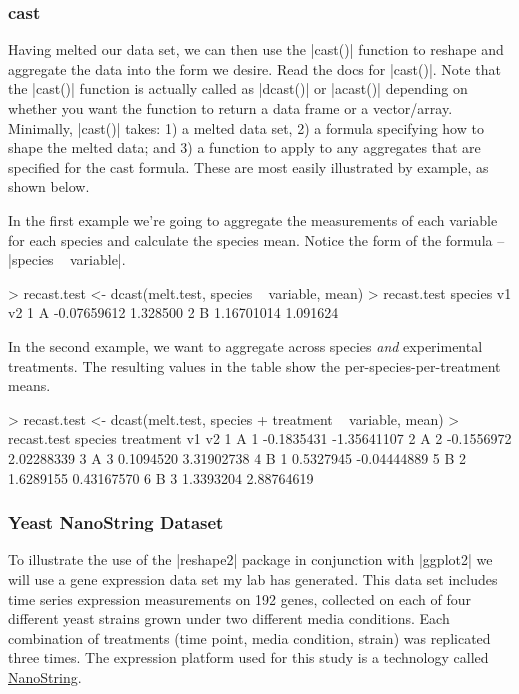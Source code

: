 \subsubsection{cast}

Having melted our data set, we can then use the |cast()| function to reshape and aggregate the data into the form we desire.  Read the docs for |cast()|.  Note that the |cast()| function is actually called as |dcast()| or |acast()| depending on whether you want the function to return a data frame or a vector/array. Minimally, |cast()| takes: 1) a melted data set,  2) a formula specifying how to shape the melted data; and 3) a function to apply to any aggregates that are specified for the cast formula. These are most easily illustrated by example, as shown below.

In the first example we're going to aggregate the measurements of each variable for each species and calculate the species mean.  Notice the form of the formula -- |species ~ variable|.
%
\begin{R}
> recast.test <- dcast(melt.test, species ~ variable, mean)
> recast.test
  species          v1       v2
1       A -0.07659612 1.328500
2       B  1.16701014 1.091624
\end{R}

In the second example, we want to aggregate across species \emph{and} experimental treatments.  The resulting values in the table show the per-species-per-treatment means.
\begin{R}
> recast.test <- dcast(melt.test, species + treatment ~ variable, mean) 
> recast.test
  species treatment         v1          v2
1       A         1 -0.1835431 -1.35641107
2       A         2 -0.1556972  2.02288339
3       A         3  0.1094520  3.31902738
4       B         1  0.5327945 -0.04444889
5       B         2  1.6289155  0.43167570
6       B         3  1.3393204  2.88764619   
\end{R}



\subsubsection{Yeast NanoString Dataset}

To illustrate the use of the |reshape2| package in conjunction with |ggplot2| we will use a gene expression data set my lab has generated.  This data set includes time series expression measurements on 192 genes, collected on each of four different yeast strains grown under two different media conditions. Each combination of treatments (time point, media condition, strain) was replicated three times.  The expression platform used for this study is a technology called \href{http://www.nanostring.com/}{NanoString}.

